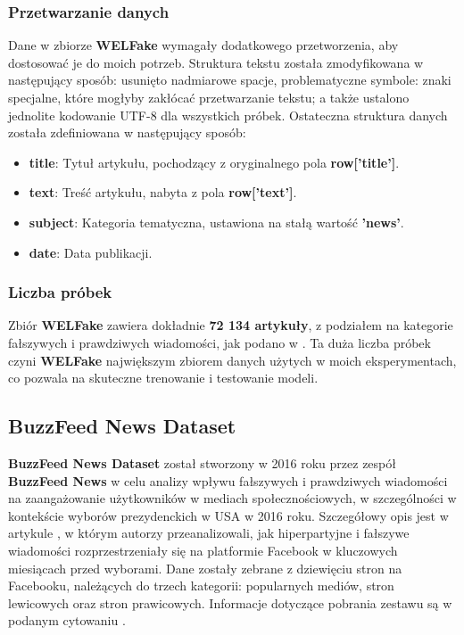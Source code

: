 \subsubsection{Przetwarzanie danych}
Dane w zbiorze \textbf{WELFake} wymagały dodatkowego przetworzenia, aby dostosować je do moich potrzeb. Struktura tekstu została zmodyfikowana w następujący sposób: usunięto nadmiarowe spacje, problematyczne symbole: znaki specjalne, które mogłyby zakłócać przetwarzanie tekstu; a także ustalono jednolite kodowanie UTF-8 dla wszystkich próbek. Ostateczna struktura danych została zdefiniowana w następujący sposób:
\begin{itemize}
	\item \textbf{title}: Tytuł artykułu, pochodzący z oryginalnego pola \textbf{row['title']}.
	\item \textbf{text}: Treść artykułu, nabyta z pola \textbf{row['text']}.
	\item \textbf{subject}: Kategoria tematyczna, ustawiona na stałą wartość \textbf{'news'}.
	\item \textbf{date}: Data publikacji.
\end{itemize}

\subsubsection{Liczba próbek}
Zbiór \textbf{WELFake} zawiera dokładnie \textbf{72 134 artykuły}, z podziałem na kategorie fałszywych i prawdziwych wiadomości, jak podano w \cite{WELFake}. Ta duża liczba próbek czyni \textbf{WELFake} największym zbiorem danych użytych w moich eksperymentach, co pozwala na skuteczne trenowanie i testowanie modeli.

\subsection{BuzzFeed News Dataset}
\textbf{BuzzFeed News Dataset} został stworzony w 2016 roku przez zespół \textbf{BuzzFeed News} w celu analizy wpływu fałszywych i prawdziwych wiadomości na zaangażowanie użytkowników w mediach społecznościowych, w szczególności w kontekście wyborów prezydenckich w USA w 2016 roku. Szczegółowy opis jest w artykule \cite{BuzzFace}, w którym autorzy przeanalizowali, jak hiperpartyjne i fałszywe wiadomości rozprzestrzeniały się na platformie Facebook w kluczowych miesiącach przed wyborami. Dane zostały zebrane z dziewięciu stron na Facebooku, należących do trzech kategorii: popularnych mediów, stron lewicowych oraz stron prawicowych. Informacje dotyczące pobrania zestawu są w podanym cytowaniu \cite{buzzfeed_news_2018_2023}.


